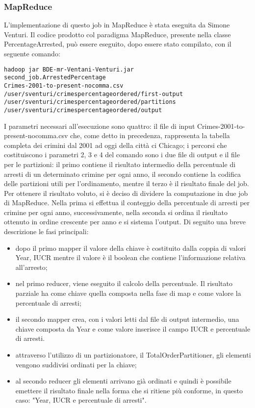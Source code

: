 \documentclass[10pt]{article}
\begin{document}
\subsubsection{MapReduce}
L'implementazione di questo job in MapReduce è stata eseguita da Simone Venturi.
Il codice prodotto col paradigma MapReduce, presente nella classe PercentageArrested, può essere eseguito, dopo essere stato compilato, con il seguente comando:
\begin{lstlisting}
hadoop jar BDE-mr-Ventani-Venturi.jar 
second_job.ArrestedPercentage 
Crimes-2001-to-present-nocomma.csv 
/user/sventuri/crimespercentageordered/first-output 
/user/sventuri/crimespercentageordered/partitions 
/user/sventuri/crimespercentageordered/output
\end{lstlisting}
I parametri necessari all’esecuzione sono quattro: il file di input Crimes-2001-to-present-nocomma.csv che, come detto in precedenza, rappresenta la tabella completa dei crimini dal 2001 ad oggi della città ci Chicago; i percorsi che costituiscono i parametri 2, 3 e 4 del comando sono i due file di output e il file per le partizioni: il primo contiene il risultato intermedio della percentuale di arresti di un determinato crimine per ogni anno, il secondo contiene la codifica delle partizioni utili per l’ordinamento, mentre il terzo è il risultato finale del job.
Per ottenere il risultato voluto, si è deciso di dividere la computazione in due job di MapReduce. Nella prima si effettua il conteggio della percentuale di arresti per crimine per ogni anno, successivamente, nella seconda si ordina il risultato ottenuto in ordine crescente per anno e si sistema l’output.
Di seguito una breve descrizione le fasi principali:
\begin{itemize}
\item dopo il primo mapper il valore della chiave è costituito dalla coppia di valori Year, IUCR mentre il valore è il boolean che contiene l’informazione relativa all’arresto; 
\item nel primo reducer, viene eseguito il calcolo della percentuale. Il risultato parziale ha come chiave quella composta nella fase di map e come valore la percentuale di arresti;
\item il secondo mapper crea, con i valori letti dal file di output intermedio, una chiave composta da Year e come valore inserisce il campo IUCR e percentuale di arresti. 
\item attraverso l’utilizzo di un partizionatore, il TotalOrderPartitioner, gli elementi vengono suddivisi ordinati per la chiave;
\item al secondo reducer gli elementi arrivano già ordinati e quindi è possibile emettere il risultato finale nella forma che si ritiene più conforme, in questo caso: "Year, IUCR e percentuale di arresti".
\end{itemize}
\end{document}
